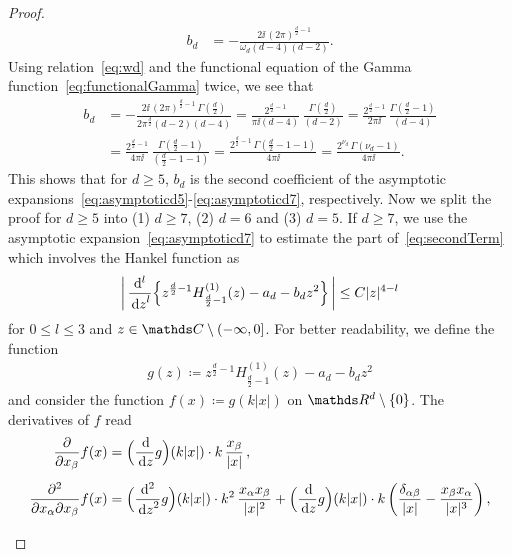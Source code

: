 \begin{proof}
\begin{align*}
 b_d 
 &= -\frac{2\ii\, (2\pi)^{\frac{d}{2} - 1}}{\omega_d (d - 4) (d - 2)}.
  \end{align*}
    Using relation~\eqref{eq:wd} and the functional equation of the Gamma function~\eqref{eq:functionalGamma} twice, we see that
    \begin{align*}
      b_d &= -\frac{2\ii\, (2\pi)^{\frac{d}{2} - 1}\, \Gamma(\frac{d}{2})}{2\pi^{\frac{d}{2}} (d - 2)(d - 4)}
 = \frac{2^{\frac{d}{2} - 1} }{\pi \ii (d - 4)}\, \frac{\Gamma(\frac{d}{2})}{(d - 2)} 
      = \frac{2^{\frac{d}{2} - 1} }{2\pi \ii } \, \frac{\Gamma(\frac{d}{2} - 1)}{(d - 4)} \\[0.5em]
      &= \frac{2^{\frac{d}{2} - 1}}{4 \pi \ii } \, \frac{\Gamma(\frac{d}{2} - 1)}{(\frac{d}{2} - 1 - 1)}
      = \frac{2^{\frac{d}{2} - 1} \, \Gamma(\frac{d}{2} - 1 - 1)}{4 \pi \ii } = \frac{2^{\nu_d}\, \Gamma(\nu_d - 1)}{4 \pi \ii}.
\end{align*}
This shows that for $d \geq 5$, $b_d$ is the second coefficient of the asymptotic expansions~\eqref{eq:asymptoticd5}-\eqref{eq:asymptoticd7}, respectively. 
Now we split the proof for $d \geq 5$ into (1) $d \geq 7$, (2) $d = 6$ and (3) $d = 5$.
If $d \geq 7$, we use the asymptotic expansion~\eqref{eq:asymptoticd7} to estimate the part of~\eqref{eq:secondTerm} which involves the Hankel function as
\begin{align}
  \label{eq:estimateDerivativesd7}
  \bigg|\, \frac{\mathrm{d}^l}{\, {\operatorname{d}\!{z}}^l} \Big\{ z^{\frac{d}{2} - 1} H_{\frac{d}{2} - 1}^{(1)}(z) - a_d - b_d z^2 \Big\} \,\bigg| 
  \leq C |z|^{4 - l}
\end{align}
for $0 \leq l \leq 3$ and $z \in \C \setminus (-\infty, 0]$.
For better readability, we define the function
\begin{align*}
  g(z) \coloneqq z^{\frac{d}{2} - 1} H_{\frac{d}{2} - 1}^{(1)}(z) - a_d - b_d z^2
\end{align*}
and consider the function $f(x) \coloneqq g(k |x|)$ on $\R^d \setminus \{0\}$.
The derivatives of $f$ read
\begin{align*}
  \frac{\partial}{\partial x_\beta} f(x)
  &= \Big(\frac{\d{}}{\d z} g\Big)(k|x|) \cdot k\, \frac{x_\beta}{|x|}\,, \\[0.5em]
  \frac{\partial^2}{\partial x_\alpha \partial x_\beta} f(x)
  &= \Big(\frac{\mathrm{d}^2}{\d z^2} g\Big)(k|x|) \cdot k^2\,  \frac{x_\alpha x_\beta}{|x|^2} 
  + \Big(\frac{\d{}}{\d z} g\Big)(k |x|) \cdot k\, \bigg( \frac{\delta_{\alpha\beta}}{|x|} - \frac{x_\beta x_\alpha}{|x|^3} \bigg)\,, \\[0.5em]

\end{align*}
\end{proof}
